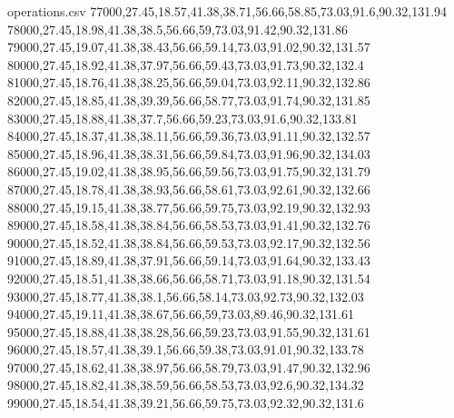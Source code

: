 \documentclass[pdflatex,sn-mathphys-num]{sn-jnl}%
\theoremstyle{thmstyleone}%
\theoremstyle{thmstyletwo}%
\theoremstyle{thmstylethree}%
\begin{document}
\begin{filecontents*}{operations.csv}
77000,27.45,18.57,41.38,38.71,56.66,58.85,73.03,91.6,90.32,131.94
78000,27.45,18.98,41.38,38.5,56.66,59,73.03,91.42,90.32,131.86
79000,27.45,19.07,41.38,38.43,56.66,59.14,73.03,91.02,90.32,131.57
80000,27.45,18.92,41.38,37.97,56.66,59.43,73.03,91.73,90.32,132.4
81000,27.45,18.76,41.38,38.25,56.66,59.04,73.03,92.11,90.32,132.86
82000,27.45,18.85,41.38,39.39,56.66,58.77,73.03,91.74,90.32,131.85
83000,27.45,18.88,41.38,37.7,56.66,59.23,73.03,91.6,90.32,133.81
84000,27.45,18.37,41.38,38.11,56.66,59.36,73.03,91.11,90.32,132.57
85000,27.45,18.96,41.38,38.31,56.66,59.84,73.03,91.96,90.32,134.03
86000,27.45,19.02,41.38,38.95,56.66,59.56,73.03,91.75,90.32,131.79
87000,27.45,18.78,41.38,38.93,56.66,58.61,73.03,92.61,90.32,132.66
88000,27.45,19.15,41.38,38.77,56.66,59.75,73.03,92.19,90.32,132.93
89000,27.45,18.58,41.38,38.84,56.66,58.53,73.03,91.41,90.32,132.76
90000,27.45,18.52,41.38,38.84,56.66,59.53,73.03,92.17,90.32,132.56
91000,27.45,18.89,41.38,37.91,56.66,59.14,73.03,91.64,90.32,133.43
92000,27.45,18.51,41.38,38.66,56.66,58.71,73.03,91.18,90.32,131.54
93000,27.45,18.77,41.38,38.1,56.66,58.14,73.03,92.73,90.32,132.03
94000,27.45,19.11,41.38,38.67,56.66,59,73.03,89.46,90.32,131.61
95000,27.45,18.88,41.38,38.28,56.66,59.23,73.03,91.55,90.32,131.61
96000,27.45,18.57,41.38,39.1,56.66,59.38,73.03,91.01,90.32,133.78
97000,27.45,18.62,41.38,38.97,56.66,58.79,73.03,91.47,90.32,132.96
98000,27.45,18.82,41.38,38.59,56.66,58.53,73.03,92.6,90.32,134.32
99000,27.45,18.54,41.38,39.21,56.66,59.75,73.03,92.32,90.32,131.6
\end{filecontents*}
\end{document}
